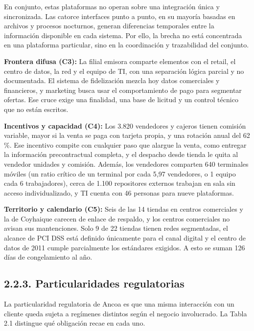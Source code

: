 \documentclass[11pt]{article}
\begin{document}
En conjunto, estas plataformas no operan sobre una integración única y sincronizada. Las catorce interfaces punto a punto, en su mayoría basadas en archivos y procesos nocturnos, generan diferencias temporales entre la información disponible en cada sistema. Por ello, la brecha no está concentrada en una plataforma particular, sino en la coordinación y trazabilidad del conjunto.

\textbf{Frontera difusa (C3):} La filial emisora comparte elementos con el retail, el centro de datos, la red y el equipo de TI, con una separación lógica parcial y no documentada. El sistema de fidelización mezcla hoy datos comerciales y financieros, y marketing busca usar el comportamiento de pago para segmentar ofertas. Ese cruce exige una finalidad, una base de licitud y un control técnico que no están escritos.

\textbf{Incentivos y capacidad (C4):} Los 3.820 vendedores y cajeros tienen comisión variable, mayor si la venta se paga con tarjeta propia, y una rotación anual del 62 \%. Ese incentivo compite con cualquier paso que alargue la venta, como entregar la información precontractual completa, y el despacho desde tienda le quita al vendedor unidades y comisión. Además, los vendedores comparten 640 terminales móviles (un ratio crítico de un terminal por cada 5,97 vendedores, o 1 equipo cada 6 trabajadores), cerca de 1.100 repositores externos trabajan en sala sin acceso individualizado, y TI cuenta con 46 personas para nueve plataformas.

\textbf{Territorio y calendario (C5):} Seis de las 14 tiendas en centros comerciales y la de Coyhaique carecen de enlace de respaldo, y los centros comerciales no avisan sus mantenciones. Solo 9 de 22 tiendas tienen redes segmentadas, el alcance de PCI DSS está definido únicamente para el canal digital y el centro de datos de 2011 cumple parcialmente los estándares exigidos. A esto se suman 126 días de congelamiento al año.

\subsection{2.2.3. Particularidades regulatorias}\label{particularidades-regulatorias}

La particularidad regulatoria de Ancoa es que una misma interacción con un cliente queda sujeta a regímenes distintos según el negocio involucrado. La Tabla 2.1 distingue qué obligación recae en cada uno.
\end{document}
